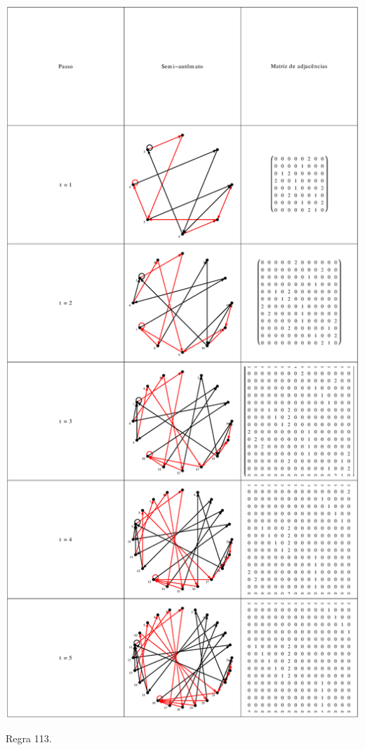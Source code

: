 \documentclass[12pt,a4paper]{article}
\begin{document}
\begin{table}[H]
\begin{center}
\includegraphics[scale=0.32]{img/mat/matr113.eps}
\caption{Regra 113.}
\label{tab:mr113}
\end{center}
\end{table}
\end{document}
